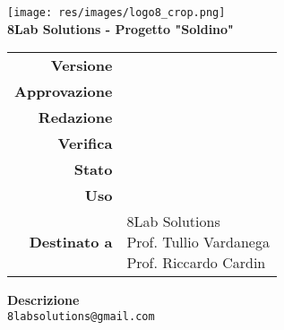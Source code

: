 \thispagestyle{empty}
\begin{titlepage}
	\begin{center}
		\texttt{[image: res/images/logo8\_crop.png]}\\
		\large \textbf{8Lab Solutions - Progetto "Soldino"} \\
		\vfill
		\Huge \textbf{\doctitle}
		\vspace*{\fill}
        
        \vfill
        \large
        \begin{tabular}{r|l}
                        \textbf{Versione} & \rev{} \\
                        \textbf{Approvazione} & \approv{} \\
                        \textbf{Redazione} & \red{} \\
                        \textbf{Verifica} & \ver{} \\
                        \textbf{Stato} & \stato{} \\
                        \textbf{Uso} & \uso{} \\
                        \textbf{Destinato a} & \parbox[t]{5cm}{8Lab Solutions
                        \\Prof. Tullio Vardanega\\Prof. Riccardo Cardin}
                \end{tabular}
                \vfill
                \normalsize
                \textbf{Descrizione}\\
				\describedoc
                \vfill
                \small
                \texttt{8labsolutions@gmail.com}
	\end{center}
\end{titlepage}
